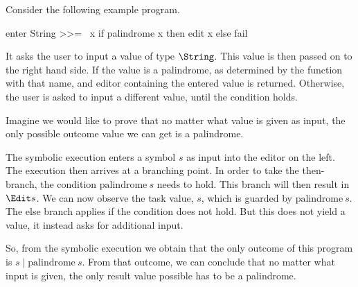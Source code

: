 \begin{example}
Consider the following example program.

\begin{TASK}
  enter String >>= \ x if palindrome x then edit x else fail
\end{TASK}

It asks the user to input a value of type $\String$.
This value is then passed on to the right hand side.
If the value is a palindrome, as determined by the function with that name,
and editor containing the entered value is returned.
Otherwise, the user is asked to input a different value, until the condition holds.

Imagine we would like to prove that no matter what value is given as input,
the only possible outcome value we can get is a palindrome.

The symbolic execution enters a symbol $s$ as input into the editor on the left.
The execution then arrives at a branching point.
In order to take the then-branch, the condition $\text{palindrome}\ s$ needs to hold.
This branch will then result in $\Edit s$.
We can now observe the task value, $s$, which is guarded by $\text{palindrome}\ s$.
The else branch applies if the condition does not hold.
But this does not yield a value, it instead asks for additional input.

So, from the symbolic execution we obtain that the only outcome of this program is $s \mid \text{palindrome}\ s$.
From that outcome, we can conclude that no matter what input is given, the only result value possible has to be a palindrome.
\end{example}
